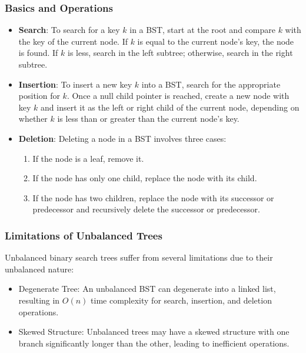 \documentclass[12pt]{book} %
\begin{document}
\subsubsection{Basics and Operations}
\begin{itemize}
    \item \textbf{Search}: To search for a key \(k\) in a BST, start at the root and compare \(k\) with the key of the current node. If \(k\) is equal to the current node's key, the node is found. If \(k\) is less, search in the left subtree; otherwise, search in the right subtree.
    
    \item \textbf{Insertion}: To insert a new key \(k\) into a BST, search for the appropriate position for \(k\). Once a null child pointer is reached, create a new node with key \(k\) and insert it as the left or right child of the current node, depending on whether \(k\) is less than or greater than the current node's key.
    
    \item \textbf{Deletion}: Deleting a node in a BST involves three cases:
        \begin{enumerate}
            \item If the node is a leaf, remove it.
            \item If the node has only one child, replace the node with its child.
            \item If the node has two children, replace the node with its successor or predecessor and recursively delete the successor or predecessor.
        \end{enumerate}
\end{itemize}

\subsubsection{Limitations of Unbalanced Trees}
Unbalanced binary search trees suffer from several limitations due to their unbalanced nature:
\begin{itemize}
    \item Degenerate Tree: An unbalanced BST can degenerate into a linked list, resulting in \(O(n)\) time complexity for search, insertion, and deletion operations.
    \item Skewed Structure: Unbalanced trees may have a skewed structure with one branch significantly longer than the other, leading to inefficient operations.
\end{itemize}
\end{document}

